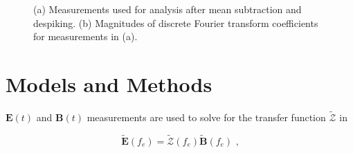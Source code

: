 \documentclass[draft,linenumbers]{agujournal2018}
\begin{document}
\begin{figure}
     \centering
    \hfill
     \caption{(a) Measurements used for analysis after mean subtraction and despiking. (b) Magnitudes of discrete Fourier transform coefficients for measurements in (a).}
  \label{fig:timeseries}
\end{figure}

\section{Models and Methods}
\label{section:Models_and_Methods}

$\mathbf{E}(t)$ and $\mathbf{B}(t)$ measurements are used to solve for the transfer function $\boldsymbol{\mathcal{\widetilde{Z}}}$ in

\begin{linenomath*}
    \begin{equation}
        \mathbf{\widetilde{E}}(f_e) = \boldsymbol{\mathcal{
    \widetilde{Z}}}(f_e)\mathbf{\widetilde{B}}(f_e)\text{ ,}
    \end{equation}
\end{linenomath*}
\end{document}

